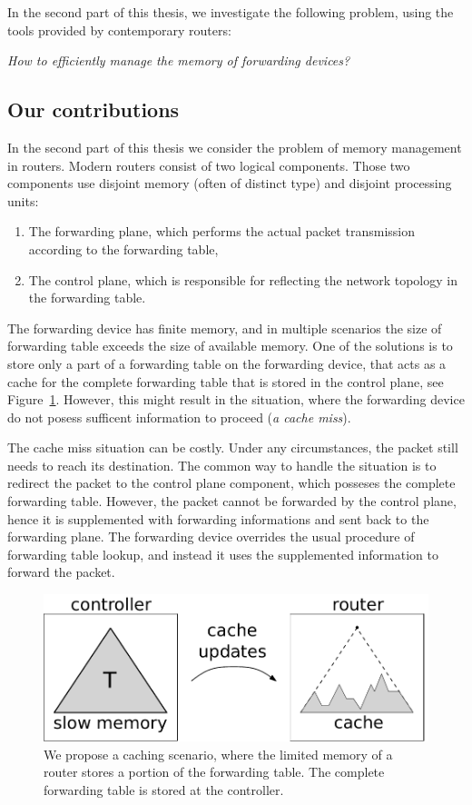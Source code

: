 In the second part of this thesis, we investigate the following problem, using the tools provided by contemporary routers:
\begin{center}
  \emph{How to efficiently manage the memory of forwarding devices?}
\end{center}


\subsection{Our contributions}

In the second part of this thesis we consider the problem of memory management in routers.
Modern routers consist of two logical components. Those two components use disjoint memory (often of distinct type) and disjoint processing units:
\begin{enumerate}
  \item The forwarding plane, which performs the actual packet transmission according to the forwarding table,
  \item The control plane, which is responsible for reflecting the network topology in the forwarding table.
\end{enumerate}

The forwarding device has finite memory, and in multiple scenarios the size of forwarding table exceeds the size of available memory.
One of the solutions is to store only a part of a forwarding table on the forwarding device, that acts as a cache for the complete forwarding table that is stored in the control plane, see Figure~\ref{fig:router}.
However, this might result in the situation, where the forwarding device do not posess sufficent information to proceed (\emph{a cache miss}).

The cache miss situation can be costly.
Under any circumstances, the packet still needs to reach its destination.
The common way to handle the situation is to redirect the packet to the control plane component, which posseses the complete forwarding table.
However, the packet cannot be forwarded by the control plane, hence it is supplemented with forwarding informations and sent back to the forwarding plane.
The forwarding device overrides the usual procedure of forwarding table lookup, and instead it uses the supplemented information to forward the packet.


\begin{figure}[t]
\centering
\includegraphics[width=0.39\columnwidth]{figs/router2.pdf}
\caption{We propose a caching scenario, where the limited memory of a router stores a portion of the forwarding table. The complete forwarding table is stored at the controller.}\label{fig:router}
\vspace{-1em}
\end{figure}




